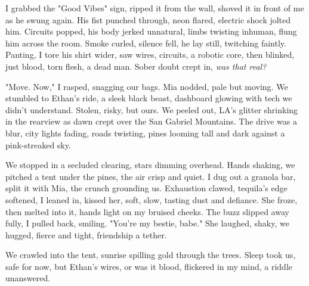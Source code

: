 \documentclass[12pt]{article}
\begin{document}
I grabbed the "Good Vibes" sign, ripped it from the wall, shoved it in front of me as he swung again. His fist punched through, neon flared, electric shock jolted him. Circuits popped, his body jerked unnatural, limbs twisting inhuman, flung him across the room. Smoke curled, silence fell, he lay still, twitching faintly. Panting, I tore his shirt wider, saw wires, circuits, a robotic core, then blinked, just blood, torn flesh, a dead man. Sober doubt crept in, \textit{was that real?}

"Move. Now," I rasped, snagging our bags. \textnormal{Mia} nodded, pale but moving. We stumbled to \textnormal{Ethan}’s ride, a sleek black beast, dashboard glowing with tech we didn’t understand. Stolen, risky, but ours. We peeled out, LA’s glitter shrinking in the rearview as dawn crept over the San Gabriel Mountains. The drive was a blur, city lights fading, roads twisting, pines looming tall and dark against a pink-streaked sky.

We stopped in a secluded clearing, stars dimming overhead. Hands shaking, we pitched a tent under the pines, the air crisp and quiet. I dug out a granola bar, split it with \textnormal{Mia}, the crunch grounding us. Exhaustion clawed, tequila’s edge softened, I leaned in, kissed her, soft, slow, tasting dust and defiance. She froze, then melted into it, hands light on my bruised cheeks. The buzz slipped away fully, I pulled back, smiling. "You’re my bestie, babe." She laughed, shaky, we hugged, fierce and tight, friendship a tether.

We crawled into the tent, sunrise spilling gold through the trees. Sleep took us, safe for now, but \textnormal{Ethan}’s wires, or was it blood, flickered in my mind, a riddle unanswered.
\end{document}
